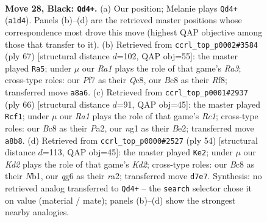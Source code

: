 \documentclass[11pt]{article}
\begin{document}
\clearpage

\begin{figure}[p]\centering
\begin{subfigure}{0.46\textwidth}\centering
\resizebox{\linewidth}{!}{%
\newchessgame
\chessboard[
  setfen={r1b1r3/1p1k1p1R/2n1p1Q1/pBP1P3/P4P2/8/5K2/q1B3N1 b - - 0 28},
  showmover=false,
  pgfstyle=straightmove, color=movearrow, markmove={a1-d4}
]}
\caption{}
\end{subfigure}\hfill
\begin{subfigure}{0.46\textwidth}\centering
\resizebox{\linewidth}{!}{%
\newchessgame
\chessboard[
  setfen={2q2rk1/1R3pbp/r2p4/3Qn1pB/3B4/2P4P/6P1/3R3K b - - 0 34},
  showmover=false,
  pgfstyle=straightmove, color=movearrow, markmove={a6-a5}
]}
\caption{}
\end{subfigure}
\\[4pt]
\begin{subfigure}{0.46\textwidth}\centering
\resizebox{\linewidth}{!}{%
\newchessgame
\chessboard[
  setfen={5k2/p2b3p/2p5/3p2qn/3Pp3/2P1NPP1/PP2BK2/2R3R1 w - - 4 34},
  showmover=false,
  pgfstyle=straightmove, color=movearrow, markmove={c1-f1}
]}
\caption{}
\end{subfigure}\hfill
\begin{subfigure}{0.46\textwidth}\centering
\resizebox{\linewidth}{!}{%
\newchessgame
\chessboard[
  setfen={2b3k1/4b1pp/4pp2/8/3qPPQP/1p1B4/r1PK4/1NR4R w - - 2 28},
  showmover=false,
  pgfstyle=straightmove, color=movearrow, markmove={d2-e2}
]}
\caption{}
\end{subfigure}
\caption{\textbf{Move 28, Black: \texttt{Qd4+}.} (a) Our position; Melanie plays \texttt{Qd4+} (\texttt{a1d4}). Panels (b)--(d) are the retrieved master positions whose correspondence most drove this move (highest QAP objective among those that transfer to it). (b) Retrieved from \texttt{ccrl\_top\_p0002\#3584} (ply 67) [structural distance $d$=102, QAP obj=55]: the master played \texttt{Ra5}; under $\mu$ our \emph{Ra1} plays the role of that game's \emph{Ra3}; cross-type roles: our \emph{P}f7 as their \emph{Q}c8, our \emph{B}c8 as their \emph{R}f8; transferred move \texttt{a8a6}. (c) Retrieved from \texttt{ccrl\_top\_p0001\#2937} (ply 66) [structural distance $d$=91, QAP obj=45]: the master played \texttt{Rcf1}; under $\mu$ our \emph{Ra1} plays the role of that game's \emph{Rc1}; cross-type roles: our \emph{B}c8 as their \emph{P}a2, our \emph{n}g1 as their \emph{B}e2; transferred move \texttt{a8b8}. (d) Retrieved from \texttt{ccrl\_top\_p0000\#2527} (ply 54) [structural distance $d$=113, QAP obj=45]: the master played \texttt{Ke2}; under $\mu$ our \emph{Kd2} plays the role of that game's \emph{Kd2}; cross-type roles: our \emph{B}c8 as their \emph{N}b1, our \emph{q}g6 as their \emph{r}a2; transferred move \texttt{d7e7}. Synthesis: no retrieved analog transferred to \texttt{Qd4+} -- the \texttt{search} selector chose it on value (material / mate); panels (b)--(d) show the strongest nearby analogies.}
\label{fig:thought-m55}
\end{figure}
\end{document}
